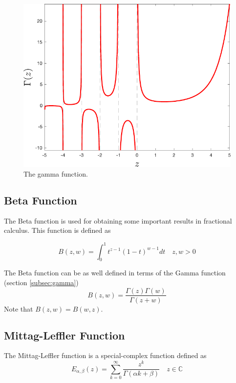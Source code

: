 \begin{figure}[H]
    \centering
    \includegraphics[scale=0.5]{files/gamma.pdf}
    \caption{The gamma function.}
    \label{fig:gamma}
\end{figure}

\subsection{Beta Function}
The Beta function is used for obtaining some important results in fractional calculus. This function is defined as

\begin{equation}
    B(z,w)=\int_0^1 t^{z-1}(1-t)^{w-1}dt\quad z,w>0
\end{equation}

The Beta function can be as well defined in terms of the Gamma function (section \ref{subsec:gamma})
\begin{equation}
    B(z,w)=\dfrac{\Gamma(z)\Gamma(w)}{\Gamma(z+w)}
\end{equation}
Note that $B(z,w)=B(w,z)$.

\subsection{Mittag-Leffler Function}
The Mittag-Leffler function is a special-complex function defined as
\begin{equation}
    E_{\alpha,\beta}(z)=\sum_{k=0}^{\infty}\dfrac{z^k}{\Gamma(\alpha k +\beta)} \quad z\in\mathbb{C}
\end{equation}

